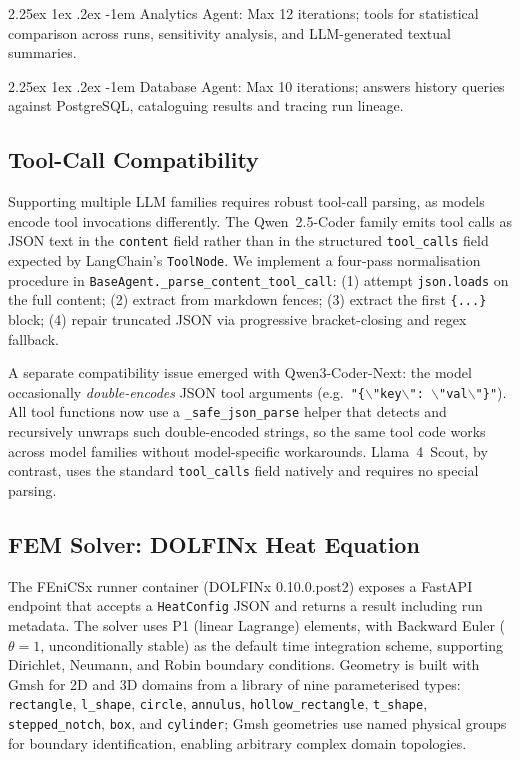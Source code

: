 \documentclass[preprint,review,12pt]{elsarticle}
\makeatletter
\renewcommand\paragraph{\@startsection{paragraph}{4}{\z@}%
  {2.25ex \@plus1ex \@minus.2ex}%
  {-1em}%
  {\normalfont\normalsize\bfseries}}
\makeatother
\begin{document}
\paragraph{Analytics Agent:}
Max 12 iterations; tools for statistical comparison across runs,
sensitivity analysis, and LLM-generated textual summaries.

\paragraph{Database Agent:}
Max 10 iterations; answers history queries against PostgreSQL,
cataloguing results and tracing run lineage.

\subsection{Tool-Call Compatibility}
\label{sec:tool-compat}

Supporting multiple LLM families requires robust tool-call parsing, as
models encode tool invocations differently.  The Qwen~2.5-Coder family
emits tool calls as JSON text in the \texttt{content} field rather than in
the structured \texttt{tool\_calls} field expected by LangChain's
\texttt{ToolNode}.  We implement a four-pass normalisation procedure in
\texttt{BaseAgent.\_parse\_content\_tool\_call}:
(1) attempt \texttt{json.loads} on the full content;
(2) extract from markdown fences;
(3) extract the first \texttt{\{...\}} block;
(4) repair truncated JSON via progressive bracket-closing and regex fallback.

A separate compatibility issue emerged with Qwen3-Coder-Next: the model
occasionally \emph{double-encodes} JSON tool arguments (e.g.\
\texttt{"\{$\backslash$"key$\backslash$": $\backslash$"val$\backslash$"\}"}).
All tool functions now use a \texttt{\_safe\_json\_parse} helper that detects
and recursively unwraps such double-encoded strings, so the same tool code
works across model families without model-specific workarounds.
Llama~4~Scout, by contrast, uses the standard \texttt{tool\_calls} field
natively and requires no special parsing.

\subsection{FEM Solver: DOLFINx Heat Equation}

The FEniCSx runner container (DOLFINx 0.10.0.post2) exposes a FastAPI
endpoint that accepts a \texttt{HeatConfig} JSON and returns a result
including run metadata.  The solver uses P1 (linear Lagrange) elements,
with Backward Euler ($\theta = 1$, unconditionally stable) as the default
time integration scheme, supporting Dirichlet, Neumann, and Robin boundary
conditions.  Geometry is built with Gmsh \citep{geuzaine2009gmsh} for 2D
and 3D domains from a library of nine parameterised types: \texttt{rectangle},
\texttt{l\_shape}, \texttt{circle}, \texttt{annulus}, \texttt{hollow\_rectangle},
\texttt{t\_shape}, \texttt{stepped\_notch}, \texttt{box}, and \texttt{cylinder};
Gmsh geometries use named physical groups for boundary identification,
enabling arbitrary complex domain topologies.
\end{document}
